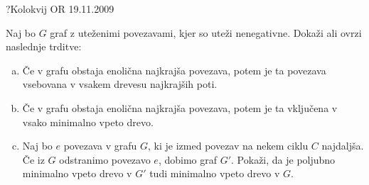 \begin{naloga}{?}{Kolokvij OR 19.11.2009}
\begin{vprasanje}
Naj bo $G$ graf z uteženimi povezavami, kjer so uteži nenegativne.
Dokaži ali ovrzi naslednje trditve:
\begin{enumerate}[(a)]
\item Če v grafu obstaja enolična najkrajša povezava,
potem je ta povezava vsebovana v vsakem drevesu najkrajših poti.
\item Če v grafu obstaja enolična najkrajša povezava,
potem je ta vključena v vsako minimalno vpeto drevo.
\item Naj bo $e$ povezava v grafu $G$,
ki je izmed povezav na nekem ciklu $C$ najdaljša.
Če iz $G$ odstranimo povezavo $e$, dobimo graf $G'$.
Pokaži, da je poljubno minimalno vpeto drevo v $G'$
tudi minimalno vpeto drevo v $G$.
\end{enumerate}
\end{vprasanje}
\begin{odgovor}
\end{odgovor}
\end{naloga}
